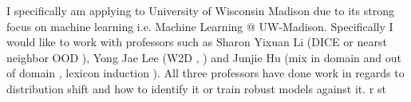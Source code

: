 \documentclass[12pt]{article}
\begin{document}



I specifically am applying to University of Wisconsin Madison due to its strong focus on machine learning i.e. Machine Learning @ UW-Madison. Specifically I would like to work with professors such as Sharon Yixuan Li (DICE \cite{sun2022dice} or nearst neighbor OOD \cite{sun2022knn}), Yong Jae Lee (W2D \cite{https://doi.org/10.48550/arxiv.2204.04384}, \cite{wang2022toward}) and Junjie Hu (mix in domain and out of domain \cite{https://doi.org/10.48550/arxiv.2106.11375}, lexicon induction \cite{hu-etal-2019-domain-adaptation}). All three professors have done work in regards to distribution shift and how to identify it or train robust models against it. r st


\end{document}
